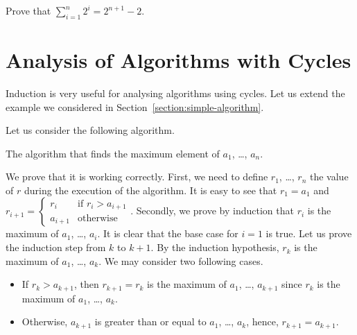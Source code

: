 \begin{exercise}
  Prove that $\sum_{i = 1}^n 2^i = 2^{n + 1} - 2$.
\end{exercise}

\section{Analysis of Algorithms with Cycles}

Induction is very useful for analysing algorithms using cycles. Let us extend
the example we considered in Section~\ref{section:simple-algorithm}.

Let us consider the following algorithm.
\begin{algorithm}
  \begin{algorithmic}[1]
        \EndIf
      \EndFor
      \State{}
    \EndFunction
  \end{algorithmic}
  \caption{The algorithm that finds the maximum element of $a_1$, \dots, $a_n$.}
\end{algorithm}
We prove that it is working correctly. First, we need to define $r_1$,
\dots, $r_n$ the value of $r$ during the execution of the algorithm.
It is easy to see that $r_1 = a_1$ and
$
  r_{i + 1} =
  \begin{cases}
    r_i & \text{if } r_i > a_{i + 1} \\
    a_{i + 1} & \text{otherwise}
  \end{cases}
$.
Secondly, we prove by induction that $r_i$ is the maximum of $a_1$, \dots,
$a_i$. It is clear that the base case for $i = 1$ is true. Let us prove the
induction step from $k$ to $k + 1$. By the induction hypothesis, $r_k$
is the maximum of $a_1$, \dots, $a_k$. We may consider two following cases.
\begin{itemize}
  \item If $r_k > a_{k + 1}$, then $r_{k + 1} = r_{k}$ is the maximum of $a_1$,
    \dots, $a_{k + 1}$ since $r_k$ is the maximum of $a_1$, \dots, $a_k$.
  \item Otherwise, $a_{k + 1}$ is greater than or equal to $a_1$, \dots, $a_k$, hence,
    $r_{k + 1} = a_{k + 1}$.
\end{itemize}

